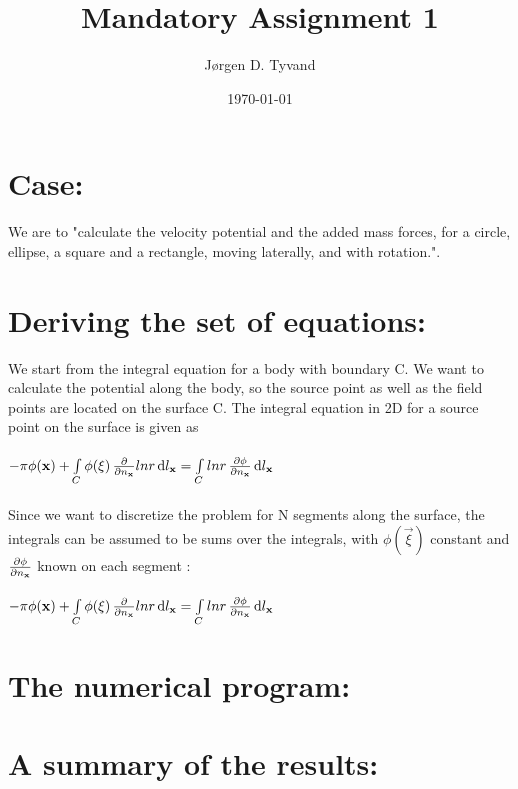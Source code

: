 \documentclass[a4paper,english,11pt,twoside]{article}
\date{\today}
\title{Mandatory Assignment 1}
\author{Jørgen D. Tyvand}
\begin{document}
\maketitle
\newpage

\section*{Case:}
We are to "calculate the velocity potential and the added mass forces, for a circle, ellipse, a square and a rectangle, moving laterally, and with rotation.". 
\section*{Deriving the set of equations:}
We start from the integral equation for a body with boundary C. We want to calculate the potential along the body, so the source point as well as the field points are located on the surface C. The integral equation in 2D for a source point on the surface is given as\\
\\
$-\pi\phi(\mathbf{x}) + \int\limits_C\phi(\mathbf{\xi})\, \frac{\partial }{\partial n_{\mathbf{x}}}lnr\, \mathrm{d}l_{\mathbf{x}} = \int\limits_Clnr\, \frac{\partial \phi}{\partial n_{\mathbf{x}}}\, \mathrm{d}l_{\mathbf{x}}$\\
\\
Since we want to discretize the problem for N segments along the surface, the integrals can be assumed to be sums over the integrals, with $\phi(\vec{\xi})$ constant and $\frac{\partial \phi}{\partial n_{\mathbf{x}}}$ known on each segment :\\
\\
$-\pi\phi(\mathbf{x}) + \int\limits_C\phi(\mathbf{\xi})\, \frac{\partial }{\partial n_{\mathbf{x}}}lnr\, \mathrm{d}l_{\mathbf{x}} = \int\limits_Clnr\, \frac{\partial \phi}{\partial n_{\mathbf{x}}}\, \mathrm{d}l_{\mathbf{x}}$\\
\section*{The numerical program:}
\section*{A summary of the results:}
 
\end{document}
